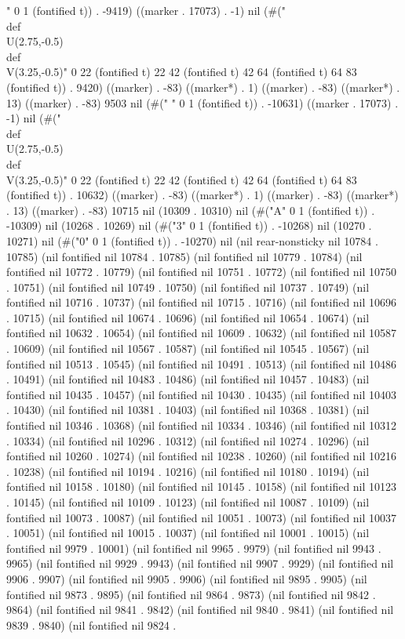 " 0 1 (fontified t)) . -9419) ((marker . 17073) . -1) nil (#("                      \\def\\U{(2.75,-0.5)}
                      \\def\\V{(3.25,-0.5)}" 0 22 (fontified t) 22 42 (fontified t) 42 64 (fontified t) 64 83 (fontified t)) . 9420) ((marker) . -83) ((marker*) . 1) ((marker) . -83) ((marker*) . 13) ((marker) . -83) 9503 nil (#("
" 0 1 (fontified t)) . -10631) ((marker . 17073) . -1) nil (#("                      \\def\\U{(2.75,-0.5)}
                      \\def\\V{(3.25,-0.5)}" 0 22 (fontified t) 22 42 (fontified t) 42 64 (fontified t) 64 83 (fontified t)) . 10632) ((marker) . -83) ((marker*) . 1) ((marker) . -83) ((marker*) . 13) ((marker) . -83) 10715 nil (10309 . 10310) nil (#("A" 0 1 (fontified t)) . -10309) nil (10268 . 10269) nil (#("3" 0 1 (fontified t)) . -10268) nil (10270 . 10271) nil (#("0" 0 1 (fontified t)) . -10270) nil (nil rear-nonsticky nil 10784 . 10785) (nil fontified nil 10784 . 10785) (nil fontified nil 10779 . 10784) (nil fontified nil 10772 . 10779) (nil fontified nil 10751 . 10772) (nil fontified nil 10750 . 10751) (nil fontified nil 10749 . 10750) (nil fontified nil 10737 . 10749) (nil fontified nil 10716 . 10737) (nil fontified nil 10715 . 10716) (nil fontified nil 10696 . 10715) (nil fontified nil 10674 . 10696) (nil fontified nil 10654 . 10674) (nil fontified nil 10632 . 10654) (nil fontified nil 10609 . 10632) (nil fontified nil 10587 . 10609) (nil fontified nil 10567 . 10587) (nil fontified nil 10545 . 10567) (nil fontified nil 10513 . 10545) (nil fontified nil 10491 . 10513) (nil fontified nil 10486 . 10491) (nil fontified nil 10483 . 10486) (nil fontified nil 10457 . 10483) (nil fontified nil 10435 . 10457) (nil fontified nil 10430 . 10435) (nil fontified nil 10403 . 10430) (nil fontified nil 10381 . 10403) (nil fontified nil 10368 . 10381) (nil fontified nil 10346 . 10368) (nil fontified nil 10334 . 10346) (nil fontified nil 10312 . 10334) (nil fontified nil 10296 . 10312) (nil fontified nil 10274 . 10296) (nil fontified nil 10260 . 10274) (nil fontified nil 10238 . 10260) (nil fontified nil 10216 . 10238) (nil fontified nil 10194 . 10216) (nil fontified nil 10180 . 10194) (nil fontified nil 10158 . 10180) (nil fontified nil 10145 . 10158) (nil fontified nil 10123 . 10145) (nil fontified nil 10109 . 10123) (nil fontified nil 10087 . 10109) (nil fontified nil 10073 . 10087) (nil fontified nil 10051 . 10073) (nil fontified nil 10037 . 10051) (nil fontified nil 10015 . 10037) (nil fontified nil 10001 . 10015) (nil fontified nil 9979 . 10001) (nil fontified nil 9965 . 9979) (nil fontified nil 9943 . 9965) (nil fontified nil 9929 . 9943) (nil fontified nil 9907 . 9929) (nil fontified nil 9906 . 9907) (nil fontified nil 9905 . 9906) (nil fontified nil 9895 . 9905) (nil fontified nil 9873 . 9895) (nil fontified nil 9864 . 9873) (nil fontified nil 9842 . 9864) (nil fontified nil 9841 . 9842) (nil fontified nil 9840 . 9841) (nil fontified nil 9839 . 9840) (nil fontified nil 9824 . 